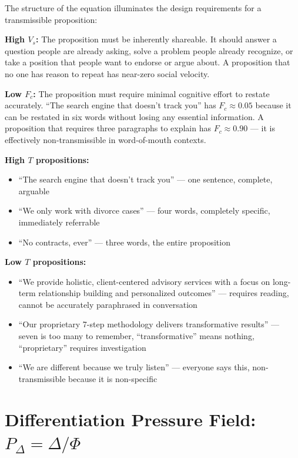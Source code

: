 \documentclass[12pt, openany]{book}
\theoremstyle{thmstyle}
\theoremstyle{defstyle}
\begin{document}
The structure of the equation illuminates the design requirements for a transmissible proposition:

\textbf{High $V_s$:} The proposition must be inherently shareable. It should answer a question people are already asking, solve a problem people already recognize, or take a position that people want to endorse or argue about. A proposition that no one has reason to repeat has near-zero social velocity.

\textbf{Low $F_c$:} The proposition must require minimal cognitive effort to restate accurately. ``The search engine that doesn't track you'' has $F_c \approx 0.05$ because it can be restated in six words without losing any essential information. A proposition that requires three paragraphs to explain has $F_c \approx 0.90$ --- it is effectively non-transmissible in word-of-mouth contexts.

\begin{examplebox}
\textbf{High $T$ propositions:}
\begin{itemize}[leftmargin=1.5em]
  \item ``The search engine that doesn't track you'' --- one sentence, complete, arguable
  \item ``We only work with divorce cases'' --- four words, completely specific, immediately referrable
  \item ``No contracts, ever'' --- three words, the entire proposition
\end{itemize}

\textbf{Low $T$ propositions:}
\begin{itemize}[leftmargin=1.5em]
  \item ``We provide holistic, client-centered advisory services with a focus on long-term relationship building and personalized outcomes'' --- requires reading, cannot be accurately paraphrased in conversation
  \item ``Our proprietary 7-step methodology delivers transformative results'' --- seven is too many to remember, ``transformative'' means nothing, ``proprietary'' requires investigation
  \item ``We are different because we truly listen'' --- everyone says this, non-transmissible because it is non-specific
\end{itemize}
\end{examplebox}

\section{Differentiation Pressure Field: $P_\Delta = \Delta / \Phi$}
\end{document}
